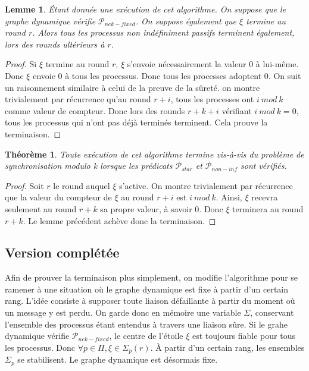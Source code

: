 \documentclass{article}
\newtheorem{lemma}{Lemme}
\newtheorem{theorem}{Théorème}
\begin{document}
\begin{lemma}
	Étant donnée une exécution de cet algorithme. On suppose que le graphe dynamique vérifie $\mathcal{P}_{nek-fixed}$.
	On suppose également que $\xi$ termine au round $r$.
	Alors tous les processus non indéfiniment passifs terminent également, lors des rounds ultérieurs à $r$.
\end{lemma}
\begin{proof}
	Si $\xi$ termine au round $r$, $\xi$ s'envoie nécessairement la valeur $0$ à lui-même. Donc $\xi$ envoie $0$ à tous les processus. 
	Donc tous les processes adoptent $0$.
	On suit un raisonnement similaire à celui de la preuve de la sûreté.
	on montre trivialement par récurrence qu'au round $r+i$, tous les processes ont $i~mod~k$ comme valeur de compteur.
	Donc lors des rounds $r+k+i$ vérifiant $i~mod~k = 0$, tous les processus qui n'ont pas déjà terminés terminent.
	Cela prouve la terminaison.
\end{proof}
\begin{theorem}
	Toute exécution de cet algorithme termine vis-à-vis du problème de synchronisation modulo k lorsque les prédicats $\mathcal{P}_{star}$ et $\mathcal{P}_{non-inf}$ sont vérifiés.
\end{theorem}
\begin{proof}
	Soit $r$ le round auquel $\xi$ s'active.
	On montre trivialement par récurrence que la valeur du compteur de $\xi$ au round $r+i$ est $i~mod~k$.
	Ainsi, $\xi$ recevra seulement au round $r+k$ sa propre valeur, à savoir $0$. Donc $\xi$ terminera au round $r+k$. Le lemme précédent achève donc la terminaison.
\end{proof}

\subsection{Version complétée}

Afin de prouver la terminaison plus simplement, on modifie l'algorithme pour se ramener à une situation où le graphe dynamique est fixe à partir d'un certain rang.
L'idée consiste à supposer toute liaison défaillante à partir du moment où un message y est perdu.
On garde donc en mémoire une variable $\Sigma$, conservant l'ensemble des processus étant entendus à travers une liaison sûre.
Si le grahe dynamique vérifie $\mathcal{P}_{nek-fixed}$, le centre de l'étoile $\xi$ est toujours fiable pour tous les processus. Donc $\forall p \in \Pi, \xi \in \Sigma_p(r)$.
À partir d'un certain rang, les ensembles $\Sigma_p$ se stabilisent. Le graphe dynamique est désormais fixe.
\end{document}
